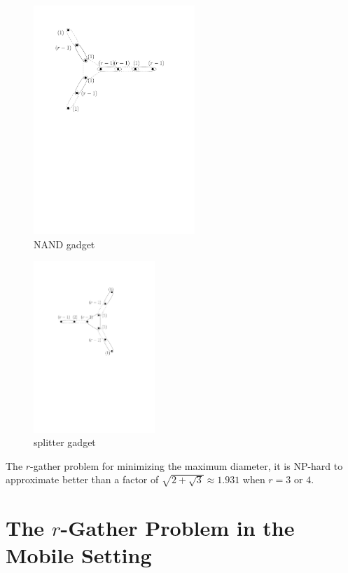 \begin{figure}[htbp]
\begin{center}
\includegraphics[width=2.4in]{figs/nandgadget}
\caption{NAND gadget}
\label{fig:nandgadget}
\end{center}
\end{figure}

\begin{figure}[htbp]
\begin{center}
\includegraphics[width=1.8in]{figs/splittergadget}
\caption{splitter gadget}
\label{fig:splittercircuit}
\end{center}
\end{figure}

\begin{theorem}
The $r$-gather problem for minimizing the maximum diameter, it is NP-hard to approximate better than a factor of $\sqrt{2+\sqrt{3}} \approx 1.931$ when $r=3$ or $4$.
\end{theorem}

\section{The $r$-Gather Problem in the Mobile Setting}

